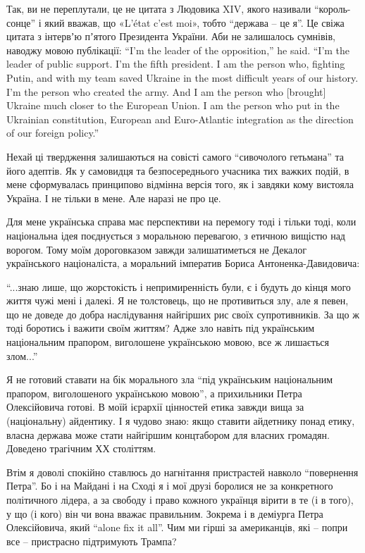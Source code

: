 Так, ви не переплутали, це не цитата з Людовика XIV, якого називали
\enquote{король-сонце} і який вважав, що «L’état c’est moi», тобто \enquote{держава – це я}. Це
свіжа цитата з інтервʼю пʼятого Президента України. Аби не залишалось сумнівів,
наводжу мовою публікації: \enquote{I’m the leader of the opposition,} he said. \enquote{I’m the
leader of public support. I’m the fifth president. I am the person who,
fighting Putin, and with my team saved Ukraine in the most difficult years of
our history. I’m the person who created the army. And I am the person who
[brought] Ukraine much closer to the European Union. I am the person who put in
the Ukrainian constitution, European and Euro-Atlantic integration as the
direction of our foreign policy.}

Нехай ці твердження залишаються на совісті самого \enquote{сивочолого гетьмана}
та його адептів. Як у самовидця та безпосереднього учасника тих важких подій, в
мене сформувалась принципово відмінна версія того, як і завдяки кому вистояла
Україна. І не тільки в мене. Але наразі не про це.

Для мене українська справа має перспективи на перемогу тоді і тільки тоді, коли
національна ідея поєднується з моральною перевагою, з етичною вищістю над
ворогом. Тому моїм дороговказом завжди залишатиметься не Декалог українського
націоналіста, а моральний імператив Бориса Антоненка-Давидовича:

\begin{zzquote}
\enquote{...знаю лише, що жорстокість і непримиренність були, є і будуть до кінця мого
життя чужі мені і далекі. Я не толстовець, що не противиться злу, але я певен,
що не доведе до добра наслідування найгірших рис своїх супротивників. За що ж
тоді боротись і важити своїм життям? Адже зло навіть під українським
національним прапором, виголошене українською мовою, все ж лишається злом...}
\end{zzquote}

Я не готовий ставати на бік морального зла \enquote{під українським національним
прапором, виголошеного українською мовою}, а прихильники Петра Олексійовича
готові. В моїй ієрархії цінностей етика завжди вища за (національну) айдентику.
І я чудово знаю: якщо ставити айдетнику понад етику, власна держава може стати
найгіршим концтабором для власних громадян. Доведено трагічним ХХ століттям.

Втім я доволі спокійно ставлюсь до нагнітання пристрастей навколо
\enquote{повернення Петра}. Бо і на Майдані і на Сході я і мої друзі боролися
не за конкретного політичного лідера, а за свободу і право кожного українця
вірити в те (і в того), у що (і кого) він чи вона вважає правильним. Зокрема і
в деміурга Петра Олексійовича, який \enquote{alone fix it all}. Чим ми гірші за
американців, які – попри все – пристрасно підтримують Трампа?

